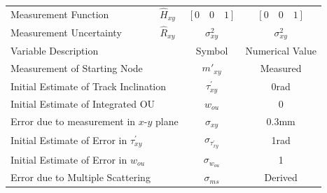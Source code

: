 \begin{table}[!htbp]
\begin{center}
\begin{threeparttable}
\begin{tabular}{lccc}
Measurement Function
& $\hat{H}_{xy}$ 
& $[0 \quad 0 \quad 1]$
& $[0 \quad 0 \quad 1]$
\\
\rule{0pt}{3ex}%

Measurement Uncertainty
& $\hat{R}_{xy}$ 
& $\sigma_{xy}^{2}$
& $\sigma_{xy}^{2}$
\\



\bottomrule

\multicolumn{2}{l}{Variable Description} 
& Symbol & Numerical Value  \\
\hline


\multicolumn{2}{l}{Measurement of Starting Node} 
& $m'_{xy}$ & Measured \\

\multicolumn{2}{l}{Initial Estimate of Track Inclination} 
& $\tau^{'}_{xy}$ & 0rad \\

\multicolumn{2}{l}{Initial Estimate of Integrated OU\tnote{*}}
& $w_{ou}$ & 0 \\

\multicolumn{2}{l}{Error due to measurement in $x$-$y$ plane} 
& $\sigma_{xy}$ & 0.3mm \\

\multicolumn{2}{l}{Initial Estimate of Error in $\tau^{'}_{xy}$} 
& $\sigma_{\tau^{'}_{xy}}$ & 1rad \\

\multicolumn{2}{l}{Initial Estimate of Error in $w_{ou}$} 
& $\sigma_{w_{ou}}$ & 1 \\

\multicolumn{2}{l}{Error due to Multiple Scattering} 
& $\sigma_{ms}$ & Derived \\


\end{tabular}
\end{threeparttable}
\end{center}
\end{table}
